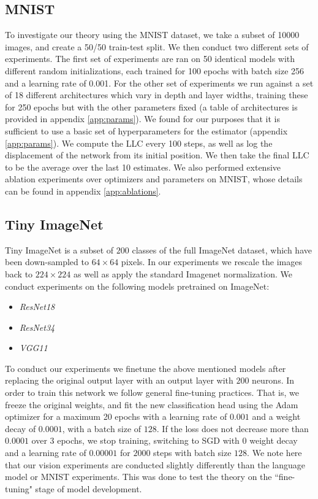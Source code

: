 \documentclass{article} %
\theoremstyle{definition}
\begin{document}
\subsection{MNIST}
To investigate our theory using the MNIST dataset, we take a subset of 10000 images, and create a 50/50 train-test split. We then conduct two different sets of experiments. The first set of experiments are ran on 50 identical models with different random initializations, each trained for 100 epochs with batch size 256 and a learning rate of 0.001. For the other set of experiments we run against a set of 18 different architectures which vary in depth and layer widths, training these for 250 epochs but with the other parameters fixed (a table of architectures is provided in appendix \ref{app:params}). We found for our purposes that it is sufficient to use a basic set of hyperparameters for the estimator (appendix \ref{app:params}). We compute the LLC every 100 steps, as well as log the displacement of the network from its initial position. We then take the final LLC to be the average over the last 10 estimates. We also performed extensive ablation experiments over optimizers and parameters on MNIST, whose details can be found in appendix \ref{app:ablations}.

\subsection{Tiny ImageNet}
Tiny ImageNet \citep{Le2015TinyIV} is a subset of $200$ classes of the full ImageNet dataset, which have been down-sampled to $64 \times 64$ pixels. In our experiments we rescale the images back to $224 \times 224$ as well as apply the standard Imagenet normalization. We conduct experiments on the following models pretrained on ImageNet:
\begin{itemize}
    \item \textit{ResNet18} \citep{he2015deepresiduallearningimage}
    \item \textit{ResNet34} \citep{he2015deepresiduallearningimage}
    \item \textit{VGG11} \citep{simonyan2015deepconvolutionalnetworkslargescale}
\end{itemize}
To conduct our experiments we finetune the above mentioned models after replacing the original output layer with an output layer with $200$ neurons. In order to train this network we follow general fine-tuning practices. That is, we freeze the original weights, and fit the new classification head using the Adam optimizer for a maximum 20 epochs with a learning rate of $0.001$ and a weight decay of $0.0001$, with a batch size of $128$. If the loss does not decrease more than $0.0001$ over 3 epochs, we stop training, switching to SGD with $0$ weight decay and a learning rate of $0.00001$ for $2000$ steps with batch size $128$. We note here that our vision experiments are conducted slightly differently than the language model or MNIST experiments. This was done to test the theory on the ``fine-tuning" stage of model development.
\end{document}
